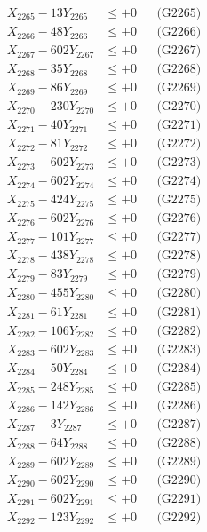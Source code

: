\documentclass[a4paper,10pt]{article}
\begin{document}
{\begin{align}
X_{2265} - 13Y_{2265} &\leq +0 && \text{(G2265)} \\
X_{2266} - 48Y_{2266} &\leq +0 && \text{(G2266)} \\
X_{2267} - 602Y_{2267} &\leq +0 && \text{(G2267)} \\
X_{2268} - 35Y_{2268} &\leq +0 && \text{(G2268)} \\
X_{2269} - 86Y_{2269} &\leq +0 && \text{(G2269)} \\
X_{2270} - 230Y_{2270} &\leq +0 && \text{(G2270)} \\
\allowbreak
X_{2271} - 40Y_{2271} &\leq +0 && \text{(G2271)} \\
X_{2272} - 81Y_{2272} &\leq +0 && \text{(G2272)} \\
X_{2273} - 602Y_{2273} &\leq +0 && \text{(G2273)} \\
X_{2274} - 602Y_{2274} &\leq +0 && \text{(G2274)} \\
X_{2275} - 424Y_{2275} &\leq +0 && \text{(G2275)} \\
X_{2276} - 602Y_{2276} &\leq +0 && \text{(G2276)} \\
X_{2277} - 101Y_{2277} &\leq +0 && \text{(G2277)} \\
X_{2278} - 438Y_{2278} &\leq +0 && \text{(G2278)} \\
X_{2279} - 83Y_{2279} &\leq +0 && \text{(G2279)} \\
X_{2280} - 455Y_{2280} &\leq +0 && \text{(G2280)} \\
\allowbreak
X_{2281} - 61Y_{2281} &\leq +0 && \text{(G2281)} \\
X_{2282} - 106Y_{2282} &\leq +0 && \text{(G2282)} \\
X_{2283} - 602Y_{2283} &\leq +0 && \text{(G2283)} \\
X_{2284} - 50Y_{2284} &\leq +0 && \text{(G2284)} \\
X_{2285} - 248Y_{2285} &\leq +0 && \text{(G2285)} \\
X_{2286} - 142Y_{2286} &\leq +0 && \text{(G2286)} \\
X_{2287} - 3Y_{2287} &\leq +0 && \text{(G2287)} \\
X_{2288} - 64Y_{2288} &\leq +0 && \text{(G2288)} \\
X_{2289} - 602Y_{2289} &\leq +0 && \text{(G2289)} \\
X_{2290} - 602Y_{2290} &\leq +0 && \text{(G2290)} \\
\allowbreak
X_{2291} - 602Y_{2291} &\leq +0 && \text{(G2291)} \\
X_{2292} - 123Y_{2292} &\leq +0 && \text{(G2292)} \\

\end{align}}
\end{document}

